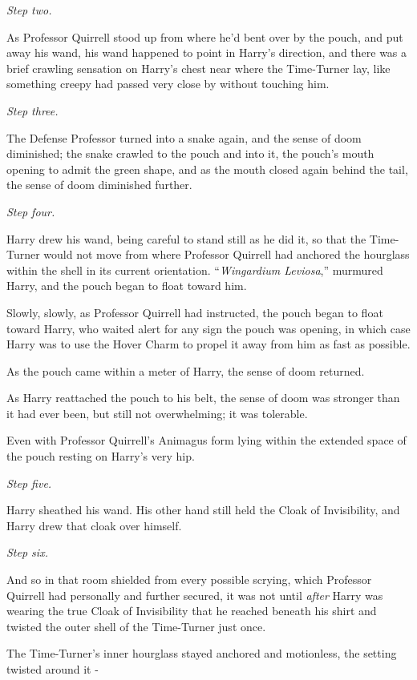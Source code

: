 \emph{Step two.}

As Professor Quirrell stood up from where he'd bent over by the pouch,
and put away his wand, his wand happened to point in Harry's direction,
and there was a brief crawling sensation on Harry's chest near where the
Time-Turner lay, like something creepy had passed very close by without
touching him.

\emph{Step three.}

The Defense Professor turned into a snake again, and the sense of doom
diminished; the snake crawled to the pouch and into it, the pouch's
mouth opening to admit the green shape, and as the mouth closed again
behind the tail, the sense of doom diminished further.

\emph{Step four.}

Harry drew his wand, being careful to stand still as he did it, so that
the Time-Turner would not move from where Professor Quirrell had
anchored the hourglass within the shell in its current orientation.
``\emph{Wingardium Leviosa},'' murmured Harry, and the pouch began to
float toward him.

Slowly, slowly, as Professor Quirrell had instructed, the pouch began to
float toward Harry, who waited alert for any sign the pouch was opening,
in which case Harry was to use the Hover Charm to propel it away from
him as fast as possible.

As the pouch came within a meter of Harry, the sense of doom returned.

As Harry reattached the pouch to his belt, the sense of doom was
stronger than it had ever been, but still not overwhelming; it was
tolerable.

Even with Professor Quirrell's Animagus form lying within the extended
space of the pouch resting on Harry's very hip.

\emph{Step five.}

Harry sheathed his wand. His other hand still held the Cloak of
Invisibility, and Harry drew that cloak over himself.

\emph{Step six.}

And so in that room shielded from every possible scrying, which
Professor Quirrell had personally and further secured, it was not until
\emph{after} Harry was wearing the true Cloak of Invisibility that he
reached beneath his shirt and twisted the outer shell of the Time-Turner
just once.

The Time-Turner's inner hourglass stayed anchored and motionless, the
setting twisted around it -

